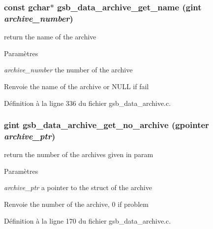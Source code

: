 \subsubsection[{gsb\_\-data\_\-archive\_\-get\_\-name}]{\setlength{\rightskip}{0pt plus 5cm}const gchar$\ast$ gsb\_\-data\_\-archive\_\-get\_\-name (gint {\em archive\_\-number})}\label{gsb__data__archive_8h_ab61c1a7e1814ae6b8d5fd6f54db3606b}
return the name of the archive


\begin{DoxyParams}{Paramètres}
\item[{\em archive\_\-number}]the number of the archive\end{DoxyParams}
\begin{DoxyReturn}{Renvoie}
the name of the archive or NULL if fail 
\end{DoxyReturn}


Définition à la ligne 336 du fichier gsb\_\-data\_\-archive.c.

\subsubsection[{gsb\_\-data\_\-archive\_\-get\_\-no\_\-archive}]{\setlength{\rightskip}{0pt plus 5cm}gint gsb\_\-data\_\-archive\_\-get\_\-no\_\-archive (gpointer {\em archive\_\-ptr})}\label{gsb__data__archive_8h_a4d89b738aff63b952bd74a74c9e4bdff}
return the number of the archives given in param


\begin{DoxyParams}{Paramètres}
\item[{\em archive\_\-ptr}]a pointer to the struct of the archive\end{DoxyParams}
\begin{DoxyReturn}{Renvoie}
the number of the archive, 0 if problem 
\end{DoxyReturn}


Définition à la ligne 170 du fichier gsb\_\-data\_\-archive.c.

